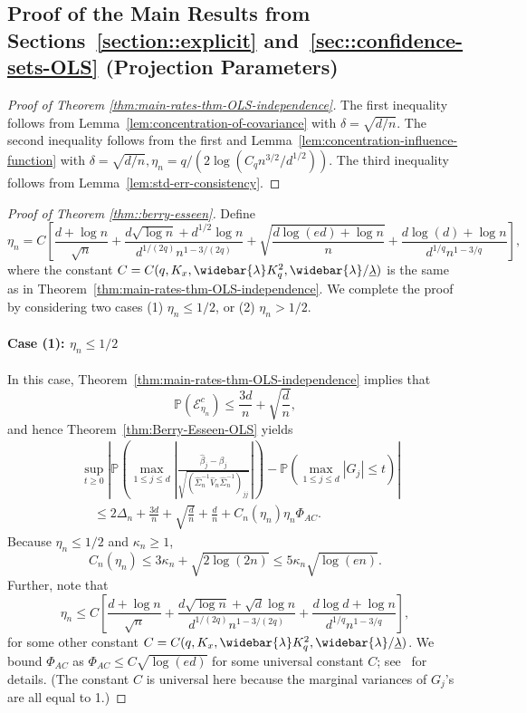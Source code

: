 \documentclass[11pt]{article}
\begin{document}
\begin{appendices}
\section{Proof of the Main Results from Sections~\ref{section::explicit} and~\ref{sec::confidence-sets-OLS} (Projection Parameters)}
\label{appendix:main.ols}

\begin{proof}[Proof of Theorem \ref{thm:main-rates-thm-OLS-independence}]
The first inequality follows from Lemma~\ref{lem:concentration-of-covariance} with $\delta = \sqrt{d/n}$. The second inequality follows from the first and Lemma~\ref{lem:concentration-influence-function} with $\delta = \sqrt{d/n}, \eta_n = q/(2\log(C_qn^{3/2}/d^{1/2}))$. The third inequality follows from Lemma~\ref{lem:std-err-consistency}.
\end{proof}

\begin{proof}[Proof of Theorem \ref{thm::berry-esseen}]
Define
\[
\eta_n = C\left[\frac{d + \log n}{\sqrt{n}} + \frac{d\sqrt{\log n} + d^{1/2}\log n}{d^{1/(2q)}n^{1 - 3/(2q)}} + \sqrt{\frac{d\log(ed) + \log n}{n}}+ \frac{d\log(d) + \log n}{d^{1/q}n^{1-3/q}}\right],
\]
where the constant $C = C(q, K_x, \widebar{\lambda}K_q^2, \widebar{\lambda}/\underline{\lambda})$ is the same as in Theorem~\ref{thm:main-rates-thm-OLS-independence}. 
We complete the proof by considering two cases (1) $\eta_n \le 1/2$, or (2) $\eta_n > 1/2$. 
\paragraph{Case (1): $\eta_n \le 1/2$} In this case, Theorem~\ref{thm:main-rates-thm-OLS-independence} implies that
\[
\mathbb{P}\left(\mathcal{E}_{\eta_n}^{c}\right) \le \frac{3d}{n} + \sqrt{\frac{d}{n}},
\]
and hence Theorem~\ref{thm:Berry-Esseen-OLS} yields
\begin{align*}
&\sup_{t\ge 0}\left|\mathbb{P}\left(\max_{1\le j\le d}\left|\frac{\widehat{\beta}_j - \beta_j}{\sqrt{(\widehat{\Sigma}_n^{-1}\widehat{V}_n\widehat{\Sigma}_n^{-1})_{jj}}}\right|\right) - \mathbb{P}\left(\max_{1\le j\le d}|G_j| \le t\right)\right|\\
&\quad\le 2\Delta_n + \frac{3d}{n} + \sqrt{\frac{d}{n}} + \frac{d}{n} + C_n(\eta_n)\eta_n\Phi_{AC}.
\end{align*}
Because $\eta_n \le 1/2$ and $\kappa_n \ge1$, 
$$
C_n(\eta_n) \le 3\kappa_n + \sqrt{2\log(2n)} \le 5\kappa_n\sqrt{\log(en)}.
$$ 
Further, note that
\[
\eta_n \le C\left[\frac{d + \log n}{\sqrt{n}} + \frac{d\sqrt{\log n} + \sqrt{d}\log n}{d^{1/(2q)}n^{1-3/(2q)}} + \frac{d\log d + \log n}{d^{1/q}n^{1-3/q}}\right],
\]
for some other constant $C = C(q, K_x, \widebar{\lambda}K_q^2, \widebar{\lambda}/\underline{\lambda})$. We bound $\Phi_{AC}$ as $\Phi_{AC} \le C\sqrt{\log(ed)}$ for some universal constant $C$; see~\cite{Chern15,chernozhukov2017detailed} for details. (The constant $C$ is universal here because the marginal variances of $G_j$'s are all equal to 1.) 


\end{proof}
\end{appendices}
\end{document}
